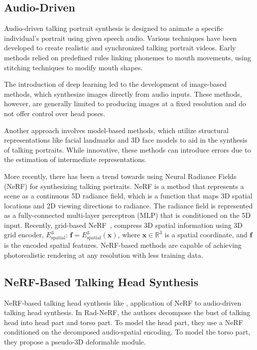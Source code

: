 \subsection{Audio-Driven}
\label{subsec:audio_driven}
Audio-driven talking portrait synthesis is designed to animate a specific individual's portrait using given speech audio. Various techniques have been developed to create realistic and synchronized talking portrait videos.
Early methods relied on predefined rules linking phonemes to mouth movements, using stitching techniques to modify mouth shapes.

The introduction of deep learning led to the development of image-based methods, which synthesize images directly from audio inputs.
These methods, however, are generally limited to producing images at a fixed resolution and do not offer control over head poses.

Another approach involves model-based methods, which utilize structural representations like facial landmarks and 3D face models to aid in the synthesis of talking portraits.
While innovative, these methods can introduce errors due to the estimation of intermediate representations.

More recently, there has been a trend towards using Neural Radiance Fields (NeRF) for synthesizing talking portraits.
NeRF\cite{mildenhall2020nerf} is a method that represents a scene as a continuous 5D radiance field, which is a function that maps 3D spatial locations and 2D viewing directions to radiance.
The radiance field is represented as a fully-connected multi-layer perceptron (MLP) that is conditioned on the 5D input.
Recently, grid-based NeRF~\cite{TensoRF, mueller2022instant}, compress 3D spatial information using 3D grid encoder, $E^3_\text{spatial}$:
$\mathbf{f} = E^3_\text{spatial}(\mathbf{x})$, where $\mathbf{x} \in \mathbb{R}^3$ is a spatial coordinate, and $\mathbf{f}$ is the encoded spatial features.
NeRF-based methods are capable of achieving photorealistic rendering at any resolution with less training data.\cite{li2023ernerf}

\subsection{NeRF-Based Talking Head Synthesis}
NeRF-based talking head synthesis like \cite{li2023ernerf, tang2022radnerf}, application of NeRF to audio-driven talking head synthesis.
In Rad-NeRF\cite{tang2022radnerf}, the authors decompose the bust of talking head into head part and torso part.  To model the head part, they use a NeRF conditioned on the decomposed audio-spatial encoding. To model the torso part, they propose a pseudo-3D deformable module.
    

